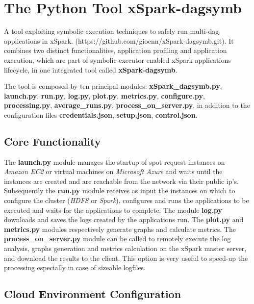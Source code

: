 \section{The Python Tool xSpark-dagsymb}\label{sec:xspark_dagsymb}

A tool exploiting symbolic execution techniques to safely run multi-dag
applications in xSpark. (https://github.com/gioenn/xSpark-dagsymb.git).
It combines two distinct functionalities, application profiling and
application execution, which are part of symbolic executor enabled
xSpark applications lifecycle, in one integrated tool called
\textbf{xSpark-dagsymb}.

The tool is composed by ten principal modules:
\textbf{xSpark\_dagsymb.py}, \textbf{launch.py}, \textbf{run.py},
\textbf{log.py}, \textbf{plot.py}, \textbf{metrics.py},
\textbf{configure.py}, \textbf{processing.py},
\textbf{average\_runs.py}, \textbf{process\_on\_server.py}, in addition
to the configuration files \textbf{credentials.json},
\textbf{setup.json}, \textbf{control.json}.

\hypertarget{core-functionality}{%
\subsection{Core Functionality}\label{core-functionality}}

The \textbf{launch.py} module manages the startup of spot request
instances on \emph{Amazon EC2} or virtual machines on \emph{Microsoft
Azure} and waits until the instances are created and are reachable from
the network via their public ip's. Subsequently the \textbf{run.py}
module receives as input the instances on which to configure the cluster
(\emph{HDFS} or \emph{Spark}), configures and runs the applications to
be executed and waits for the applications to complete. The module
\textbf{log.py} downloads and saves the logs created by the applications
run. The \textbf{plot.py} and \textbf{metrics.py} modules respectively
generate graphs and calculate metrics. The
\textbf{process\_on\_server.py} module can be called to remotely execute
the log analysis, graphs generation and metrics calculation on the
xSpark master server, and download the results to the client. This
option is very useful to speed-up the processing especially in case of
sizeable logfiles.

\hypertarget{cloud-environment-configuration}{%
\subsection{Cloud Environment
	Configuration}\label{cloud-environment-configuration}}

